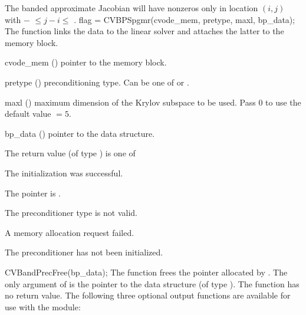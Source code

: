 {
  The banded approximate Jacobian will have nonzeros only in location $(i,j)$
  with $-$ $\leq j-i \leq$ .
}
{
  flag = CVBPSpgmr(cvode\_mem, pretype, maxl, bp\_data);
}
{
  The function  links the {\cvbandpre} data to the
  {\cvspgmr} linear solver and attaches the latter to the {\cvode}
  memory block.
}
{
  \begin{args}
  \item[cvode\_mem] ()
    pointer to the {\cvode} memory block.
  \item[pretype] ()
    preconditioning type. Can be one of  or .
  \item[maxl] ()
    maximum dimension of the Krylov subspace to be used. Pass $0$ to use the 
    default value $=5$.
  \item[bp\_data] ()
    pointer to the {\cvbandpre} data structure.
  \end{args}
}
{
  The return value  (of type ) is one of
  \begin{args}
  \item[\Id{SUCCESS}] 
    The {\cvspgmr} initialization was successful.
  \item[\Id{LIN\_NO\_MEM}]
    The  pointer is .
  \item[\Id{LIN\_ILL\_INPUT}]
    The preconditioner type  is not valid.
  \item[\Id{LMEM\_FAIL}]
    A memory allocation request failed.
  \item[\Id{BP\_NO\_DATA}]
    The {\cvbandpre} preconditioner has not been initialized.
  \end{args}
}
{}
{
  CVBandPrecFree(bp\_data);
}
{
  The function  frees the pointer allocated by
  .
}
{
  The only argument of  is the pointer to the {\cvbandpre} 
  data structure (of type ).
}
{
  The function  has no return value.
}
{}
The following three optional output functions are available for use with 
the {\cvbandpre} module:
